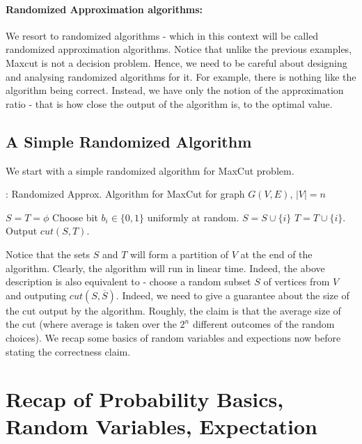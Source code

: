 \paragraph*{Randomized Approximation algorithms: }
We resort to randomized algorithms - which in this context will be called randomized approximation algorithms. Notice that unlike the previous examples, {\sc Maxcut} is not a decision problem. Hence, we need to be careful about designing and analysing randomized algorithms for it. For example, there is nothing like the algorithm being correct. Instead, we have only the notion of the approximation ratio - that is how close the output of the algorithm is, to the optimal value.

\subsection{A Simple Randomized Algorithm} We start with a simple randomized algorithm for {\sc MaxCut} problem.

\begin{algorithm}%
\label{alg:maxcut-rand}
\caption{: Randomized Approx. Algorithm for {\sc MaxCut} for graph $G(V,E)$, $|V| = n$}
\begin{algorithmic}[1]
\State $S = T = \phi$
\State Choose bit $b_i \in \{0,1\}$ uniformly at random.
\State $S = S \cup \{i\}$
\Else
\State $T = T \cup \{i\}$.
\EndIf
\EndFor
\State Output $cut(S,T)$.
\end{algorithmic}
\end{algorithm}

Notice that the sets $S$ and $T$ will form a partition of $V$ at the end of the algorithm. Clearly, the algorithm will run in linear time. Indeed, the above description is also equivalent to - choose a random subset $S$ of vertices from $V$ and outputing $cut(S,\overline{S})$. Indeed, we need to give a guarantee about the size of the cut output by the algorithm. Roughly, the claim is that the average size of the cut (where average is taken over the $2^n$ different outcomes of the random choices). We recap some basics of random variables and expections now before stating the correctness claim.

\section{Recap of Probability Basics, Random Variables, Expectation}

